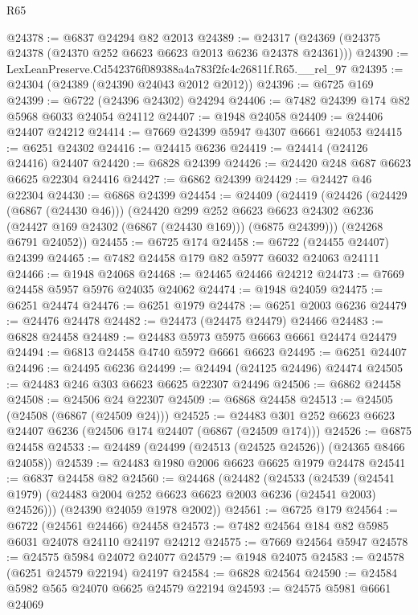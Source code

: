 \begin{lexlean}{R65}
\begin{coremodule}
{@24378 := @6837 @24294 @82 @2013
@24389 := @24317 (@24369 (@24375 @24378 (@24370 @252 @6623 @6623 @2013 @6236 @24378 @24361)))
@24390 := LexLeanPreserve.Cd542376f089388a4a783f2fc4c26811f.R65.__rel_97
@24395 := @24304 (@24389 (@24390 @24043 @2012 @2012))
@24396 := @6725 @169
@24399 := @6722 (@24396 @24302) @24294
@24406 := @7482 @24399 @174 @82 @5968 @6033 @24054 @24112
@24407 := @1948 @24058
@24409 := @24406 @24407 @24212
@24414 := @7669 @24399 @5947 @4307 @6661 @24053
@24415 := @6251 @24302
@24416 := @24415 @6236
@24419 := @24414 (@24126 @24416) @24407
@24420 := @6828 @24399
@24426 := @24420 @248 @687 @6623 @6625 @22304 @24416
@24427 := @6862 @24399
@24429 := @24427 @46 @22304
@24430 := @6868 @24399
@24454 := @24409
    (@24419
      (@24426
        (@24429 (@6867 (@24430 @46)))
        (@24420
          @299
          @252
          @6623
          @6623
          @24302
          @6236
          (@24427 @169 @24302 (@6867 (@24430 @169)))
          (@6875 @24399)))
      (@24268 @6791 @24052))
@24455 := @6725 @174
@24458 := @6722 (@24455 @24407) @24399
@24465 := @7482 @24458 @179 @82 @5977 @6032 @24063 @24111
@24466 := @1948 @24068
@24468 := @24465 @24466 @24212
@24473 := @7669 @24458 @5957 @5976 @24035 @24062
@24474 := @1948 @24059
@24475 := @6251 @24474
@24476 := @6251 @1979
@24478 := @6251 @2003 @6236
@24479 := @24476 @24478
@24482 := @24473 (@24475 @24479) @24466
@24483 := @6828 @24458
@24489 := @24483 @5973 @5975 @6663 @6661 @24474 @24479
@24494 := @6813 @24458 @4740 @5972 @6661 @6623
@24495 := @6251 @24407
@24496 := @24495 @6236
@24499 := @24494 (@24125 @24496) @24474
@24505 := @24483 @246 @303 @6623 @6625 @22307 @24496
@24506 := @6862 @24458
@24508 := @24506 @24 @22307
@24509 := @6868 @24458
@24513 := @24505 (@24508 (@6867 (@24509 @24)))
@24525 := @24483 @301 @252 @6623 @6623 @24407 @6236 (@24506 @174 @24407 (@6867 (@24509 @174)))
@24526 := @6875 @24458
@24533 := @24489 (@24499 (@24513 (@24525 @24526)) (@24365 @8466 @24058))
@24539 := @24483 @1980 @2006 @6623 @6625 @1979 @24478
@24541 := @6837 @24458 @82
@24560 := @24468
    (@24482
      (@24533
        (@24539 (@24541 @1979) (@24483 @2004 @252 @6623 @6623 @2003 @6236 (@24541 @2003) @24526)))
      (@24390 @24059 @1978 @2002))
@24561 := @6725 @179
@24564 := @6722 (@24561 @24466) @24458
@24573 := @7482 @24564 @184 @82 @5985 @6031 @24078 @24110 @24197 @24212
@24575 := @7669 @24564 @5947
@24578 := @24575 @5984 @24072 @24077
@24579 := @1948 @24075
@24583 := @24578 (@6251 @24579 @22194) @24197
@24584 := @6828 @24564
@24590 := @24584 @5982 @565 @24070 @6625 @24579 @22194
@24593 := @24575 @5981 @6661 @24069
}
\end{coremodule}
\end{lexlean}
